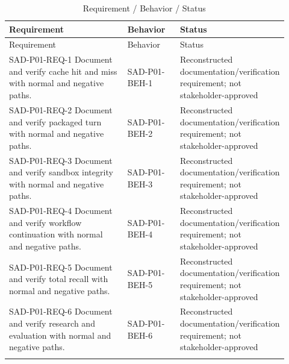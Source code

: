 \documentclass[10pt,letterpaper]{article}
\begin{document}
\begin{longtable}{@{}>{\raggedright\arraybackslash}p{0.44\linewidth}>{\raggedright\arraybackslash}p{0.19\linewidth}>{\raggedright\arraybackslash}p{0.29\linewidth}@{}}
\caption{Requirement / Behavior / Status}\\
\toprule Requirement & Behavior & Status\\\midrule\endfirsthead
\toprule Requirement & Behavior & Status\\\midrule\endhead
SAD-P01-REQ-1 Document and verify cache hit and miss with normal and negative paths. & SAD-P01-BEH-1 & Reconstructed documentation/verification requirement; not stakeholder-approved\\\addlinespace
SAD-P01-REQ-2 Document and verify packaged turn with normal and negative paths. & SAD-P01-BEH-2 & Reconstructed documentation/verification requirement; not stakeholder-approved\\\addlinespace
SAD-P01-REQ-3 Document and verify sandbox integrity with normal and negative paths. & SAD-P01-BEH-3 & Reconstructed documentation/verification requirement; not stakeholder-approved\\\addlinespace
SAD-P01-REQ-4 Document and verify workflow continuation with normal and negative paths. & SAD-P01-BEH-4 & Reconstructed documentation/verification requirement; not stakeholder-approved\\\addlinespace
SAD-P01-REQ-5 Document and verify total recall with normal and negative paths. & SAD-P01-BEH-5 & Reconstructed documentation/verification requirement; not stakeholder-approved\\\addlinespace
SAD-P01-REQ-6 Document and verify research and evaluation with normal and negative paths. & SAD-P01-BEH-6 & Reconstructed documentation/verification requirement; not stakeholder-approved\\\addlinespace
\bottomrule\end{longtable}
\end{document}
